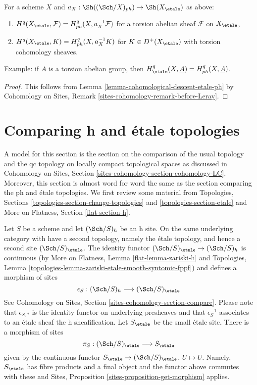 \begin{lemma}
\label{lemma-compare-cohomology-etale-ph}
For a scheme $X$ and $a_X : \Sh((\Sch/X)_{ph}) \to \Sh(X_\etale)$
as above:
\begin{enumerate}
\item $H^q(X_\etale, \mathcal{F}) = H^q_{ph}(X, a_X^{-1}\mathcal{F})$
for a torsion abelian sheaf $\mathcal{F}$ on $X_\etale$,
\item $H^q(X_\etale, K) = H^q_{ph}(X, a_X^{-1}K)$
for $K \in D^+(X_\etale)$ with torsion cohomology sheaves.
\end{enumerate}
Example: if $A$ is a torsion abelian group, then
$H^q_\etale(X, \underline{A}) = H^q_{ph}(X, \underline{A})$.
\end{lemma}

\begin{proof}
This follows from Lemma \ref{lemma-cohomological-descent-etale-ph}
by Cohomology on Sites, Remark \ref{sites-cohomology-remark-before-Leray}.
\end{proof}












\section{Comparing h and \'etale topologies}
\label{section-h-etale}

\noindent
A model for this section is the section on the comparison of the
usual topology and the qc topology on locally compact topological
spaces as discussed in
Cohomology on Sites, Section \ref{sites-cohomology-section-cohomology-LC}.
Moreover, this section is almost word for word the same as the
section comparing the ph and \'etale topologies.
We first review some material from
Topologies, Sections
\ref{topologies-section-change-topologies} and
\ref{topologies-section-etale} and
More on Flatness, Section \ref{flat-section-h}.

\medskip\noindent
Let $S$ be a scheme and let $(\Sch/S)_h$ be an h site.
On the same underlying category with have a second topology,
namely the \'etale topology, and hence a second site
$(\Sch/S)_\etale$. The identity functor
$(\Sch/S)_\etale \to (\Sch/S)_h$ is continuous
(by More on Flatness, Lemma \ref{flat-lemma-zariski-h}
and Topologies, Lemma
\ref{topologies-lemma-zariski-etale-smooth-syntomic-fppf})
and defines a morphism of sites
$$
\epsilon_S : (\Sch/S)_h \longrightarrow (\Sch/S)_\etale
$$
See Cohomology on Sites, Section \ref{sites-cohomology-section-compare}.
Please note that $\epsilon_{S, *}$ is the identity functor on underlying
presheaves and that $\epsilon_S^{-1}$ associates to an \'etale sheaf the
h sheafification. Let $S_\etale$ be the small \'etale site.
There is a morphism of sites
$$
\pi_S : (\Sch/S)_\etale \longrightarrow S_\etale
$$
given by the continuous functor
$S_\etale \to (\Sch/S)_\etale$, $U \mapsto U$.
Namely, $S_\etale$ has fibre products and a final object and the
functor above commutes with these and
Sites, Proposition \ref{sites-proposition-get-morphism} applies.

